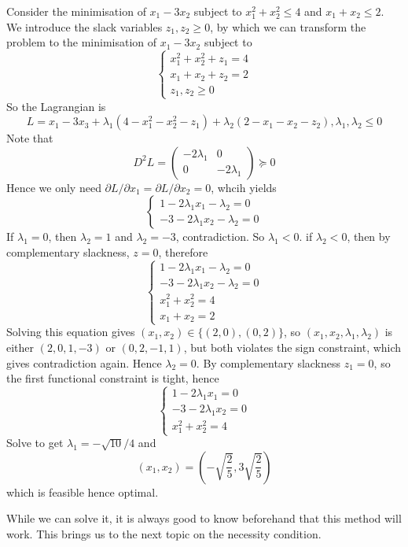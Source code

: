 \begin{example}
    Consider the minimisation of $x_1-3x_2$ subject to $x_1^2+x_2^2\le 4$ and $x_1+x_2\le 2$.
    We introduce the slack variables $z_1,z_2\ge 0$, by which we can transform the problem to the minimisation of $x_1-3x_2$ subject to
    $$\begin{cases}
        x_1^2+x_2^2+z_1=4\\
        x_1+x_2+z_2=2\\
        z_1,z_2\ge 0
    \end{cases}$$
    So the Lagrangian is
    $$L=x_1-3x_3+\lambda_1(4-x_1^2-x_2^2-z_1)+\lambda_2(2-x_1-x_2-z_2),\lambda_1,\lambda_2\le 0$$
    Note that
    $$D^2L=\begin{pmatrix}
        -2\lambda_1&0\\
        0&-2\lambda_1
    \end{pmatrix}\succeq 0$$
    Hence we only need $\partial L/\partial x_1=\partial L/\partial x_2=0$, whcih yields
    $$\begin{cases}
        1-2\lambda_1x_1-\lambda_2=0\\
        -3-2\lambda_1x_2-\lambda_2=0
    \end{cases}$$
    If $\lambda_1=0$, then $\lambda_2=1$ and $\lambda_2=-3$, contradiction.
    So $\lambda_1<0$.
    if $\lambda_2<0$, then by complementary slackness, $z=0$, therefore
    $$\begin{cases}
        1-2\lambda_1x_1-\lambda_2=0\\
        -3-2\lambda_1x_2-\lambda_2=0\\
        x_1^2+x_2^2=4\\
        x_1+x_2=2
    \end{cases}$$
    Solving this equation gives $(x_1,x_2)\in\{(2,0),(0,2)\}$, so $(x_1,x_2,\lambda_1,\lambda_2)$ is either $(2,0,1,-3)$ or $(0,2,-1,1)$, but both violates the sign constraint, which gives contradiction again.
    Hence $\lambda_2=0$.
    By complementary slackness $z_1=0$, so the first functional constraint is tight, hence
    $$\begin{cases}
        1-2\lambda_1x_1=0\\
        -3-2\lambda_1x_2=0\\
        x_1^2+x_2^2=4
    \end{cases}$$
    Solve to get $\lambda_1=-\sqrt{10}/4$ and
    $$(x_1,x_2)=\left( -\sqrt{\frac{2}{5}},3\sqrt{\frac{2}{5}} \right)$$
    which is feasible hence optimal.
\end{example}
While we can solve it, it is always good to know beforehand that this method will work.
This brings us to the next topic on the necessity condition.
